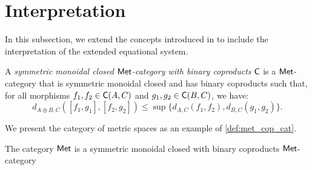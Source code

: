 \section{Interpretation}

In this subsection, we extend the concepts introduced in  to include the interpretation of the extended equational system.

\begin{definition} \label{def:met_cop_cat}
  A \emph{symmetric monoidal closed $\mathsf{Met}$-category with binary coproducts} $\mathsf{C}$ is a  $\mathsf{Met}$-category that is symmetric monoidal closed and has binary coproducts   such that, for all morphisms $f_1, f_2 \in \mathsf{C}(A, C)$ and $g_1, g_2 \in \mathsf{C}(B, C)$, we have:
\[
  d_{A \oplus B, C}([f_1, g_1], [f_2, g_2]) \leq \sup \{d_{A,C}(f_1, f_2), d_{B,C}(g_1, g_2)\}.
\]
\end{definition}


We present the category of metric spaces as an example of \autoref{def:met_cop_cat}.

\begin{proposition}
        \label{prop:vcat}
        The category $\mathsf{Met}$ is a symmetric monoidal closed with binary coproducts $\mathsf{Met}$-category 
\end{proposition}

